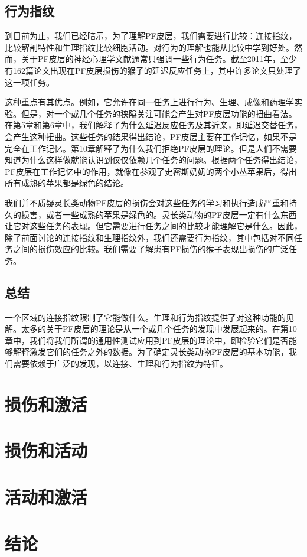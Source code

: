 \subsection{行为指纹}
到目前为止，我们已经暗示，为了理解PF皮层，我们需要进行比较：连接指纹，比较解剖特性和生理指纹比较细胞活动。对行为的理解也能从比较中学到好处。然而，关于PF皮层的神经心理学文献通常只强调一些行为任务。截至2011年，至少有162篇论文出现在PF皮层损伤的猴子的延迟反应任务上，其中许多论文只处理了这一项任务。
\par
这种重点有其优点。例如，它允许在同一任务上进行行为、生理、成像和药理学实验。但是，对一个或几个任务的狭隘关注可能会产生对PF皮层功能的扭曲看法。在第5章和第6章中，我们解释了为什么延迟反应任务及其近亲，即延迟交替任务，会产生这种扭曲。这些任务的结果得出结论，PF皮层主要在工作记忆，如果不是完全在工作记忆。第10章解释了为什么我们拒绝PF皮层的理论。但是人们不需要知道为什么这样做就能认识到仅仅依赖几个任务的问题。根据两个任务得出结论，PF皮层在工作记忆中的作用，就像在参观了史密斯奶奶的两个小丛苹果后，得出所有成熟的苹果都是绿色的结论。
\par
我们并不质疑灵长类动物PF皮层的损伤会对这些任务的学习和执行造成严重和持久的损害，或者一些成熟的苹果是绿色的。灵长类动物的PF皮层一定有什么东西让它对这些任务的表现。但它需要进行任务之间的比较才能理解它是什么。因此，除了前面讨论的连接指纹和生理指纹外，我们还需要行为指纹，其中包括对不同任务之间的损伤效应的比较。我们需要了解患有PF损伤的猴子表现出损伤的广泛任务。

\subsection{总结}
一个区域的连接指纹限制了它能做什么。生理和行为指纹提供了对这种功能的见解。太多的关于PF皮层的理论是从一个或几个任务的发现中发展起来的。在第10章中，我们将我们所谓的通用性测试应用到PF皮层的理论中，即检验它们是否能够解释激发它们的任务之外的数据。为了确定灵长类动物PF皮层的基本功能，我们需要依赖于广泛的发现，以连接、生理和行为指纹为特征。

\section{损伤和激活}

\section{损伤和活动}

\section{活动和激活}




\section{结论}


